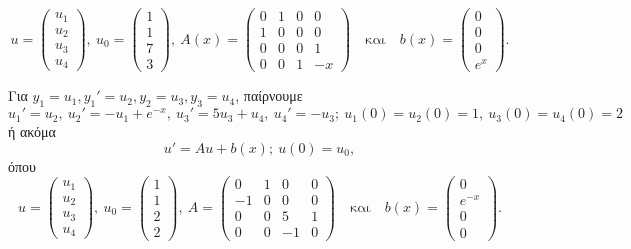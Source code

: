 \documentclass[11pt,a4paper,twoside]{book}
\begin{document}
\begin{rlist}
\[u = \begin{pmatrix} u_1 \\ u_2 \\ u_3 \\ u_4 \end{pmatrix}, \ u_0 = \begin{pmatrix} 1 \\ 1 \\ 7 \\ 3 \end{pmatrix}, \ A(x) = \begin{pmatrix} 0 & 1 & 0 & 0 \\ 1 & 0 & 0 & 0 \\ 0 & 0 & 0 & 1 \\ 0 & 0 & 1 & -x \end{pmatrix} \quad \text{και} \quad b(x) = \begin{pmatrix} 0 \\ 0 \\ 0 \\ e^x \end{pmatrix}.
\]
\item Για $y_1=u_1, y_1'=u_2, y_2=u_3, y_3=u_4$, παίρνουμε
\[
u_1'=u_2, \ u_2'=-u_1+e^{-x}, \ u_3'=5u_3+u_4, \ u_4'=-u_3; \ u_1(0)=u_2(0)=1, \ u_3(0)=u_4(0)=2
\]
ή ακόμα
\[
u' = Au+b(x); \ u(0)=u_0,
\]
όπου
\[
u = \begin{pmatrix} u_1 \\ u_2 \\ u_3 \\ u_4 \end{pmatrix}, \ u_0 = \begin{pmatrix} 1 \\ 1 \\ 2 \\ 2 \end{pmatrix}, \ A = \begin{pmatrix} 0 & 1 & 0 & 0 \\ -1 & 0 & 0 & 0 \\ 0 & 0 & 5 & 1 \\ 0 & 0 & -1 & 0 \end{pmatrix} \quad \text{και} \quad b(x) = \begin{pmatrix} 0 \\ e^{-x} \\ 0 \\ 0 \end{pmatrix}.
\]
\end{rlist}
\end{document}

